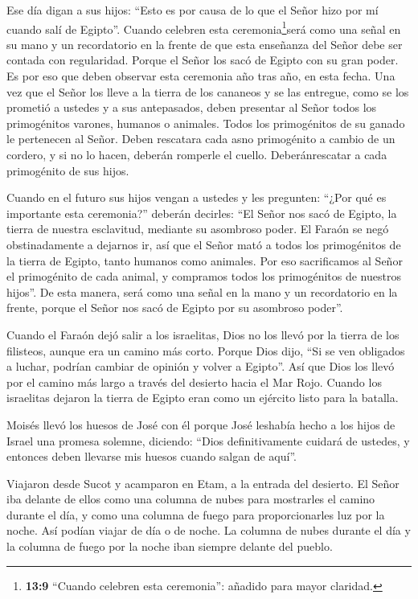  Ese día digan a sus hijos: ``Esto es por causa de lo que el
Señor hizo por mí cuando salí de Egipto''.  Cuando celebren
esta ceremonia\footnote{\textbf{13:9} ``Cuando celebren esta
  ceremonia'': añadido para mayor claridad.}será como una señal en su
mano y un recordatorio en la frente de que esta enseñanza del Señor debe
ser contada con regularidad. Porque el Señor los sacó de Egipto con su
gran poder.  Es por eso que deben observar esta ceremonia
año tras año, en esta fecha.  Una vez que el Señor los
lleve a la tierra de los cananeos y se las entregue, como se los
prometió a ustedes y a sus antepasados,  deben presentar al
Señor todos los primogénitos varones, humanos o animales. Todos los
primogénitos de su ganado le pertenecen al Señor.  Deben
rescatara cada asno primogénito a cambio de un cordero, y si no lo
hacen, deberán romperle el cuello. Deberánrescatar a cada primogénito de
sus hijos.

 Cuando en el futuro sus hijos vengan a ustedes y les
pregunten: ``¿Por qué es importante esta ceremonia?'' deberán decirles:
``El Señor nos sacó de Egipto, la tierra de nuestra esclavitud, mediante
su asombroso poder.  El Faraón se negó obstinadamente a
dejarnos ir, así que el Señor mató a todos los primogénitos de la tierra
de Egipto, tanto humanos como animales. Por eso sacrificamos al Señor el
primogénito de cada animal, y compramos todos los primogénitos de
nuestros hijos''.  De esta manera, será como una señal en
la mano y un recordatorio en la frente, porque el Señor nos sacó de
Egipto por su asombroso poder''.

 Cuando el Faraón dejó salir a los israelitas, Dios no los
llevó por la tierra de los filisteos, aunque era un camino más corto.
Porque Dios dijo, ``Si se ven obligados a luchar, podrían cambiar de
opinión y volver a Egipto''.  Así que Dios los llevó por el
camino más largo a través del desierto hacia el Mar Rojo. Cuando los
israelitas dejaron la tierra de Egipto eran como un ejército listo para
la batalla.

 Moisés llevó los huesos de José con él porque José
leshabía hecho a los hijos de Israel una promesa solemne, diciendo:
``Dios definitivamente cuidará de ustedes, y entonces deben llevarse mis
huesos cuando salgan de aquí''.

 Viajaron desde Sucot y acamparon en Etam, a la entrada del
desierto.  El Señor iba delante de ellos como una columna
de nubes para mostrarles el camino durante el día, y como una columna de
fuego para proporcionarles luz por la noche. Así podían viajar de día o
de noche.  La columna de nubes durante el día y la columna
de fuego por la noche iban siempre delante del pueblo.

